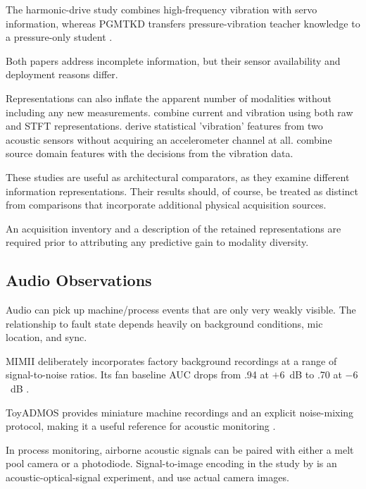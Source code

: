 The harmonic-drive study combines high-frequency vibration with servo information, whereas PGMTKD
transfers pressure-vibration teacher knowledge to a pressure-only student
\parencite{yang_fault_2024,li_pgmtkd_2025}.

Both papers address incomplete information, but their sensor availability and deployment reasons
differ.

Representations can also inflate the apparent number of modalities without including any new
measurements. \textcite{kullu_deep-learning-based_2022} combine current and vibration using both raw and STFT representations.
\textcite{wan_pipeline_2024} derive statistical 'vibration' features from two acoustic sensors
without acquiring an accelerometer channel at all. \textcite{wang_multi-source_2025} combine
source domain features with the decisions from the vibration data.

These studies are useful as architectural comparators, as they examine different information
representations. Their results should, of course, be treated as distinct from comparisons that
incorporate additional physical acquisition sources.

An acquisition inventory and a description of the retained representations are required prior to
attributing any predictive gain to modality diversity.

\subsection{Audio Observations}

Audio can pick up machine/process events that are only very weakly visible. The relationship to
fault state depends heavily on background conditions, mic location, and sync.

MIMII deliberately incorporates factory background recordings at a range of signal-to-noise ratios.
Its fan baseline AUC drops from .94 at $+6$~dB to .70 at $-6$~dB \parencite[Table~3]{purohit_mimii_2019}.

ToyADMOS provides miniature machine recordings and an explicit noise-mixing protocol, making it a
useful reference for acoustic monitoring \parencite{koizumi_toyadmos_2019}.

In process monitoring, airborne acoustic signals can be paired with either a melt pool camera or a
photodiode. Signal-to-image encoding in the study by \textcite{li_feature-level_2022} is an acoustic-optical-signal experiment,
and \textcite{xie_audio-visual_2025} use actual camera images.

